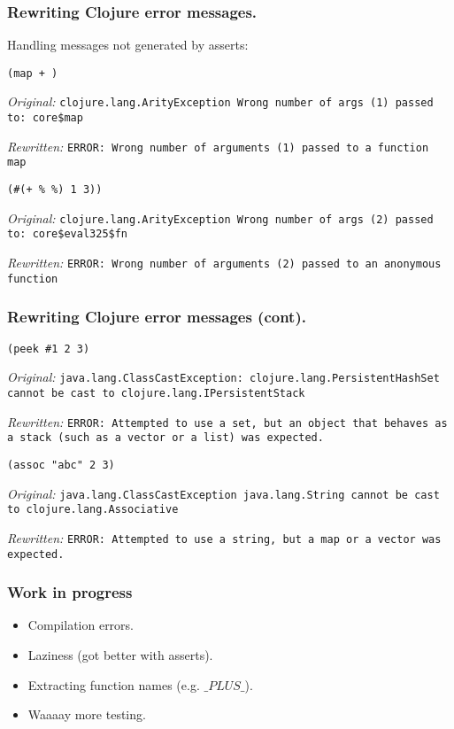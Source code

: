 \documentclass{beamer}
\begin{document}
\begin{frame}[fragile]
  \frametitle{Rewriting Clojure error messages.}
Handling messages not generated by asserts:

\vspace{.1in}

{\tt (map + )}

{\it Original:}
{\tt clojure.lang.ArityException Wrong number of args (1) passed to: core\$map}

{\it Rewritten:}
{\tt ERROR: Wrong number of arguments (1)  passed to a function map}

\vspace{.1in}

{\tt (\#(+ \% \%) 1 3))}

{\it Original:}
{\tt clojure.lang.ArityException Wrong number of args (2) passed to: core\$eval325\$fn}

{\it Rewritten:}
{\tt ERROR: Wrong number of arguments (2)  passed to an anonymous function}
 
\end{frame}

\begin{frame}[fragile]
  \frametitle{Rewriting Clojure error messages (cont).}

{\tt (peek \#{1 2 3})}

{\it Original:}
{\tt java.lang.ClassCastException: clojure.lang.PersistentHashSet cannot be cast to clojure.lang.IPersistentStack}

{\it Rewritten:}
{\tt ERROR: Attempted to use a set, but an object that behaves as a stack (such as a vector or a list) was expected.}

\vspace{.1in}

{\tt (assoc "abc" 2 3)}

{\it Original:}
{\tt  java.lang.ClassCastException java.lang.String cannot be cast to clojure.lang.Associative}

{\it Rewritten:}
{\tt ERROR: Attempted to use a string, but a map or a vector was expected.}
\end{frame}

\begin{frame}
  \frametitle{Work in progress}
\begin{itemize}
\item Compilation errors.
\item Laziness (got better with asserts). 
\item Extracting function names (e.g. $\_PLUS\_$).
\item Waaaay more testing.
\end{itemize}
\end{frame}
\end{document}
